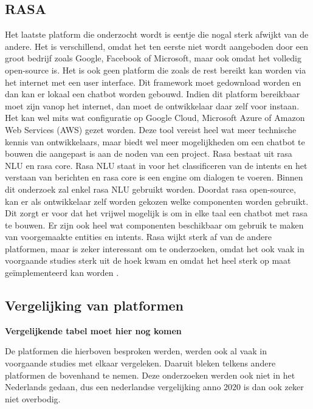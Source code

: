 \subsection{RASA}
\label{subsec:nlp-platformen-rasa}

Het laatste platform die onderzocht wordt is eentje die nogal sterk afwijkt van de andere. Het is verschillend, omdat het ten eerste niet wordt aangeboden door een groot bedrijf zoals Google, Facebook of Microsoft, maar ook omdat het volledig open-source is. Het is ook geen platform die zoals de rest bereikt kan worden via het internet met een user interface. Dit framework moet gedownload worden en dan kan er lokaal een chatbot worden gebouwd. Indien dit platform bereikbaar moet zijn vanop het internet, dan moet de ontwikkelaar daar zelf voor instaan. Het kan wel mits wat configuratie op Google Cloud, Microsoft Azure of Amazon Web Services (AWS) gezet worden. Deze tool vereist heel wat meer technische kennis van ontwikkelaars, maar biedt wel meer mogelijkheden om een chatbot te bouwen die aangepast is aan de noden van een project. Rasa bestaat uit rasa NLU en rasa core.  Rasa NLU staat in voor het classificeren van de intents en het verstaan van berichten en rasa core is een engine om dialogen te voeren. Binnen dit onderzoek zal enkel rasa NLU gebruikt worden. Doordat rasa open-source, kan er als ontwikkelaar zelf worden gekozen welke componenten worden gebruikt. Dit zorgt er voor dat het vrijwel mogelijk is om in elke taal een chatbot met rasa te bouwen. Er zijn ook heel wat componenten beschikbaar om gebruik te maken van voorgemaakte entities en intents. Rasa wijkt sterk af van de andere platformen, maar is zeker interessant om te onderzoeken, omdat het ook vaak in voorgaande studies sterk uit de hoek kwam en omdat het heel sterk op maat geïmplementeerd kan worden \autocite{RASA2020}.

\subsection{Vergelijking van platformen}
\label{subsec:nlp-platformen-vegelijking-platformen}

\textbf{Vergelijkende tabel moet hier nog komen}

De platformen die hierboven besproken werden, werden ook al vaak in voorgaande studies met elkaar vergeleken. Daaruit bleken telkens andere platformen de bovenhand te nemen. Deze onderzoeken werden ook niet in het Nederlands gedaan, dus een nederlandse vergelijking anno 2020 is dan ook zeker niet overbodig.

